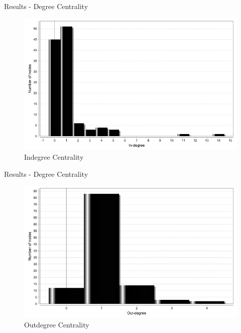\begin{frame}{Results - Degree Centrality}
\begin{figure}
	\includegraphics[scale=0.4]{inc/img/Glyco1/InDegreeDistr.png}
\caption{Indegree Centrality}
\end{figure}
\end{frame}
\begin{frame}{Results - Degree Centrality}
\begin{figure}
	\includegraphics[scale=0.4]{inc/img/Glyco1/OutDegreeDistr.png}
\caption{Outdegree Centrality}
\end{figure}
\end{frame}
